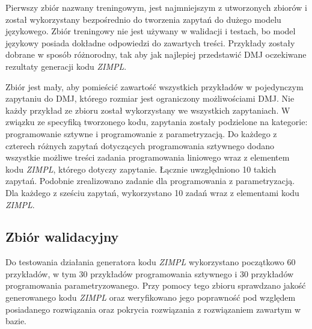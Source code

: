 Pierwszy zbiór nazwany treningowym, jest najmniejszym z utworzonych zbiorów i został wykorzystany bezpośrednio do tworzenia zapytań do dużego modelu językowego. Zbiór treningowy nie jest używany w walidacji i testach, bo model językowy posiada dokładne odpowiedzi do zawartych treści. Przykłady zostały dobrane w sposób różnorodny, tak aby jak najlepiej przedstawić DMJ oczekiwane rezultaty generacji kodu \textit{ZIMPL}. %


Zbiór jest mały, aby pomieścić zawartość wszystkich przykładów w pojedynczym zapytaniu do DMJ, którego rozmiar jest ograniczony możliwościami DMJ. %
Nie każdy przykład ze zbioru został wykorzystany we wszystkich zapytaniach. W związku ze specyfiką tworzonego kodu, zapytania zostały podzielone na kategorie: programowanie sztywne i programowanie z parametryzacją. Do każdego z czterech różnych zapytań dotyczących programowania sztywnego %
dodano wszystkie możliwe treści zadania programowania liniowego %
wraz z elementem kodu  \textit{ZIMPL}, którego dotyczy zapytanie. Łącznie uwzględniono 10 takich zapytań. Podobnie zrealizowano zadanie dla programowania z parametryzacją. Dla każdego z sześciu zapytań, wykorzystano 10 zadań wraz z elementami kodu  \textit{ZIMPL}. %

\subsection{Zbiór walidacyjny}

Do testowania działania generatora kodu  \textit{ZIMPL} wykorzystano początkowo 60 przykładów, w tym 30 przykładów programowania sztywnego i 30 przykładów programowania parametryzowanego. Przy pomocy tego zbioru sprawdzano jakość generowanego kodu  \textit{ZIMPL} oraz weryfikowano jego poprawność pod względem posiadanego rozwiązania oraz pokrycia rozwiązania z rozwiązaniem zawartym w bazie.

